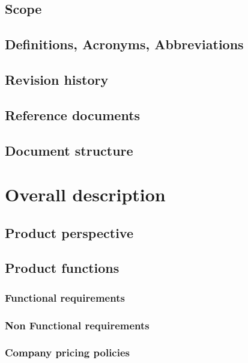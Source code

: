 \documentclass[a4paper,oneside,11pt]{article}
\begin{document}
        \subsection{Scope}
            
        \subsection{Definitions, Acronyms, Abbreviations}
            
        \subsection{Revision history}
        \subsection{Reference documents}
            
        \subsection{Document structure}
        
        
    \newpage
    \section{Overall description}
        \subsection{Product perspective}
            
        \subsection{Product functions}
            
            \subsubsection{Functional requirements}
            
            \subsubsection{Non Functional requirements}
            
            \subsubsection{Company pricing policies}
            
\end{document}
